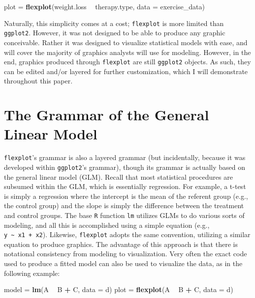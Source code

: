 \documentclass[
  doc]{apa6}
\newenvironment{Shaded}{\begin{snugshade}}{\end{snugshade}}
\newcommand{\DataTypeTok}[1]{\textcolor[rgb]{0.13,0.29,0.53}{#1}}
\newcommand{\KeywordTok}[1]{\textcolor[rgb]{0.13,0.29,0.53}{\textbf{#1}}}
\newcommand{\NormalTok}[1]{#1}
\newcommand{\OperatorTok}[1]{\textcolor[rgb]{0.81,0.36,0.00}{\textbf{#1}}}
\newcommand{\StringTok}[1]{\textcolor[rgb]{0.31,0.60,0.02}{#1}}
\begin{document}
\begin{Shaded}
\begin{Highlighting}[]
\NormalTok{plot =}\StringTok{ }\KeywordTok{flexplot}\NormalTok{(weight.loss }\OperatorTok{~}\StringTok{ }\NormalTok{therapy.type, }\DataTypeTok{data =}\NormalTok{ exercise_data)}
\end{Highlighting}
\end{Shaded}

Naturally, this simplicity comes at a cost; \texttt{flexplot} is more limited than \texttt{ggplot2}. However, it was not designed to be able to produce any graphic conceivable. Rather it was designed to visualize statistical models with ease, and will cover the majority of graphics analysts will use for modeling. However, in the end, graphics produced through \texttt{flexplot} are still \texttt{ggplot2} objects. As such, they can be edited and/or layered for further customization, which I will demonstrate throughout this paper.

\hypertarget{the-grammar-of-the-general-linear-model}{%
\section{The Grammar of the General Linear Model}\label{the-grammar-of-the-general-linear-model}}

\texttt{flexplot}'s grammar is also a layered grammar (but incidentally, because it was developed within \texttt{ggplot2}'s grammar), though its grammar is actually based on the general linear model (GLM). Recall that most statistical procedures are subsumed within the GLM, which is essentially regression. For example, a t-test is simply a regression where the intercept is the mean of the referent group (e.g., the control group) and the slope is simply the difference between the treatment and control groups. The base \texttt{R} function \texttt{lm} utilizes GLMs to do various sorts of modeling, and all this is accomplished using a simple equation (e.g., \texttt{y\ \textasciitilde{}\ x1\ +\ x2}). Likewise, \texttt{flexplot} adopts the same convention, utilizing a similar equation to produce graphics. The advantage of this approach is that there is notational consistency from modeling to visualization. Very often the exact code used to produce a fitted model can also be used to visualize the data, as in the following example:

\begin{Shaded}
\begin{Highlighting}[]
\NormalTok{model =}\StringTok{       }\KeywordTok{lm}\NormalTok{(A }\OperatorTok{~}\StringTok{ }\NormalTok{B }\OperatorTok{+}\StringTok{ }\NormalTok{C, }\DataTypeTok{data =}\NormalTok{ d)}
\NormalTok{plot  =}\StringTok{ }\KeywordTok{flexplot}\NormalTok{(A }\OperatorTok{~}\StringTok{ }\NormalTok{B }\OperatorTok{+}\StringTok{ }\NormalTok{C, }\DataTypeTok{data =}\NormalTok{ d)}
\end{Highlighting}
\end{Shaded}
\end{document}
